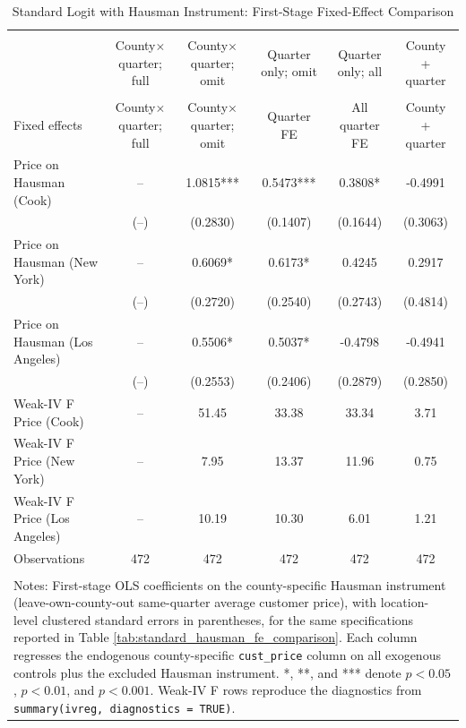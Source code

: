 \begin{table}[!htbp] \centering
  \caption{Standard Logit with Hausman Instrument: First-Stage Fixed-Effect Comparison}
  \label{tab:standard_hausman_fe_comparison_first_stage}
  \begin{tabular}{lccccc}
\\[-1.8ex]\hline
\hline \\[-1.8ex]
 & County$\times$quarter; full & County$\times$quarter; omit & Quarter only; omit & Quarter only; all & County + quarter \\
\hline \\[-1.8ex]
Fixed effects & County$\times$quarter; full & County$\times$quarter; omit & Quarter FE & All quarter FE & County + quarter \\
Price on Hausman (Cook) & -- & 1.0815*** & 0.5473*** & 0.3808* & -0.4991 \\
 & (--) & (0.2830) & (0.1407) & (0.1644) & (0.3063) \\
Price on Hausman (New York) & -- & 0.6069* & 0.6173* & 0.4245 & 0.2917 \\
 & (--) & (0.2720) & (0.2540) & (0.2743) & (0.4814) \\
Price on Hausman (Los Angeles) & -- & 0.5506* & 0.5037* & -0.4798 & -0.4941 \\
 & (--) & (0.2553) & (0.2406) & (0.2879) & (0.2850) \\
Weak-IV F Price (Cook) & -- & 51.45 & 33.38 & 33.34 & 3.71 \\
Weak-IV F Price (New York) & -- & 7.95 & 13.37 & 11.96 & 0.75 \\
Weak-IV F Price (Los Angeles) & -- & 10.19 & 10.30 & 6.01 & 1.21 \\
Observations & 472 & 472 & 472 & 472 & 472 \\
\hline \\[-1.8ex]
\multicolumn{6}{p{0.92\linewidth}}{\footnotesize Notes: First-stage OLS coefficients on the county-specific Hausman instrument (leave-own-county-out same-quarter average customer price), with location-level clustered standard errors in parentheses, for the same specifications reported in Table \ref{tab:standard_hausman_fe_comparison}. Each column regresses the endogenous county-specific \texttt{cust\_price} column on all exogenous controls plus the excluded Hausman instrument. *, **, and *** denote $p<0.05$, $p<0.01$, and $p<0.001$. Weak-IV F rows reproduce the diagnostics from \texttt{summary(ivreg, diagnostics = TRUE)}.}\\
\end{tabular}
\end{table}
